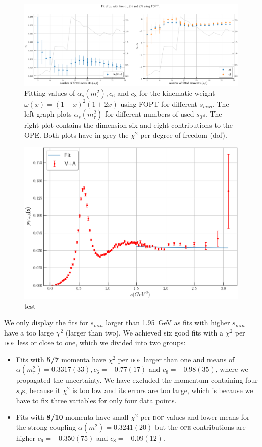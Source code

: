 \documentclass[../../index.tex]{subfiles}
\begin{document}
\begin{figure}
  \centering
  \includegraphics[width=\textwidth]{./images/fitWKinAlD6D8.eps}
  \caption{Fitting values of $\alpha_s(m_\tau^2), c_6$ and $c_8$ for the kinematic weight
    $\omega(x)=(1-x)^2(1+2x)$ using FOPT for different $s_{min}$. The left graph plots $\alpha_s(m_\tau^2)$ for
    different numbers of used $s_0$s. The right plot contains the dimension six
    and eight contributions to the OPE. Both plots have in grey the $\chi^2$ per
  degree of freedom (dof).}
  \label{fig:fitWKinAlD6D8}
\end{figure}
\begin{figure}
  \centering
  \includegraphics[width=\textwidth]{./images/fitWKinAlD6D8SpecFunc.eps}
  \caption{test}
\end{figure}
We only display the fits for $s_{min}$ larger than \SI{1.95}{\giga\eV} as fits
with higher $s_{min}$ have a too large
$\chi^2$ (larger than two). We achieved six good fits with a $\chi^2$ per \textsc{dof} less or
close to one, which we divided into two groups:
\begin{itemize}
  \item Fits with \textbf{5\-/7} momenta have $\chi^2$ per \textsc{dof} larger
    than one and means of $\alpha(m_\tau^2)=0.3317(33),
    c_6=-0.77(17)$ and $c_8=-0.98(35)$, where we propagated the uncertainty. We
    have excluded the momentum containing four $s_0$s, because it $\chi^2$ is
    too low and its errors are too large, which is because we have to fix three
    variables for only four data points.
  \item Fits with \textbf{8\-/10} momenta have small $\chi^2$ per \textsc{dof}
    values and lower means for the strong
    coupling $\alpha(m_\tau^2)=0.3241(20)$ but the \textsc{ope} contributions
    are higher $c_6=-0.350(75)$ and $c_8=-0.09(12)$.
\end{itemize}
\end{document}
